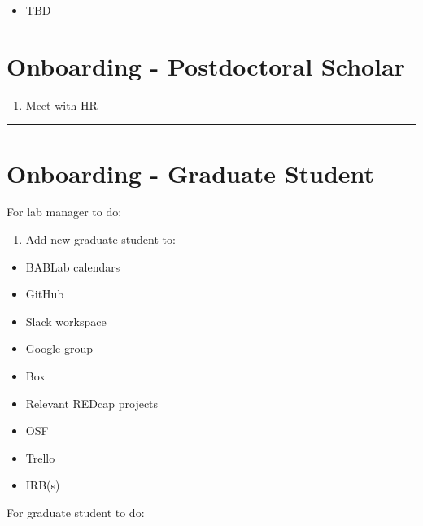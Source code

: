 \documentclass[]{book}
\providecommand{\tightlist}{%
  \setlength{\itemsep}{0pt}\setlength{\parskip}{0pt}}
\begin{document}
\begin{itemize}
\tightlist
\item
  TBD
\end{itemize}

\section{Onboarding - Postdoctoral
Scholar}\label{onboarding---postdoctoral-scholar}

\begin{enumerate}
\def\labelenumi{\arabic{enumi}.}
\tightlist
\item
  Meet with HR
\end{enumerate}

\begin{center}\rule{0.5\linewidth}{0.5pt}\end{center}

\section{Onboarding - Graduate
Student}\label{onboarding---graduate-student}

For lab manager to do:

\begin{enumerate}
\def\labelenumi{\arabic{enumi}.}
\tightlist
\item
  Add new graduate student to:
\end{enumerate}

\begin{itemize}
\tightlist
\item
  BABLab calendars
\item
  GitHub
\item
  Slack workspace
\item
  Google group
\item
  Box
\item
  Relevant REDcap projects
\item
  OSF
\item
  Trello
\item
  IRB(s)
\end{itemize}

For graduate student to do:
\end{document}
